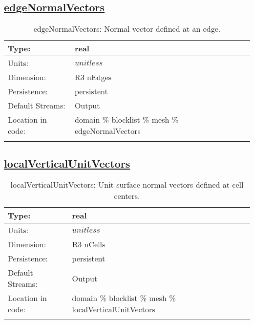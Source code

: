 \subsection[edgeNormalVectors]{\hyperref[sec:var_tab_mesh]{edgeNormalVectors}}
\label{subsec:var_sec_mesh_edgeNormalVectors}
\begin{center}
\begin{longtable}{| p{2.0in} | p{4.0in} |}
        \hline 
        Type: & real \\
        \hline 
        Units: & $unitless$ \\
        \hline 
        Dimension: & R3 nEdges \\
        \hline 
        Persistence: & persistent \\
        \hline 
		 Default Streams: & Output  \\
        \hline 
		 Location in code: & domain \% blocklist \% mesh \% edgeNormalVectors \\
		 \hline 
    \caption{edgeNormalVectors: Normal vector defined at an edge.}
\end{longtable}
\end{center}
\subsection[localVerticalUnitVectors]{\hyperref[sec:var_tab_mesh]{localVerticalUnitVectors}}
\label{subsec:var_sec_mesh_localVerticalUnitVectors}
\begin{center}
\begin{longtable}{| p{2.0in} | p{4.0in} |}
        \hline 
        Type: & real \\
        \hline 
        Units: & $unitless$ \\
        \hline 
        Dimension: & R3 nCells \\
        \hline 
        Persistence: & persistent \\
        \hline 
		 Default Streams: & Output  \\
        \hline 
		 Location in code: & domain \% blocklist \% mesh \% localVerticalUnitVectors \\
		 \hline 
    \caption{localVerticalUnitVectors: Unit surface normal vectors defined at cell centers.}
\end{longtable}
\end{center}
